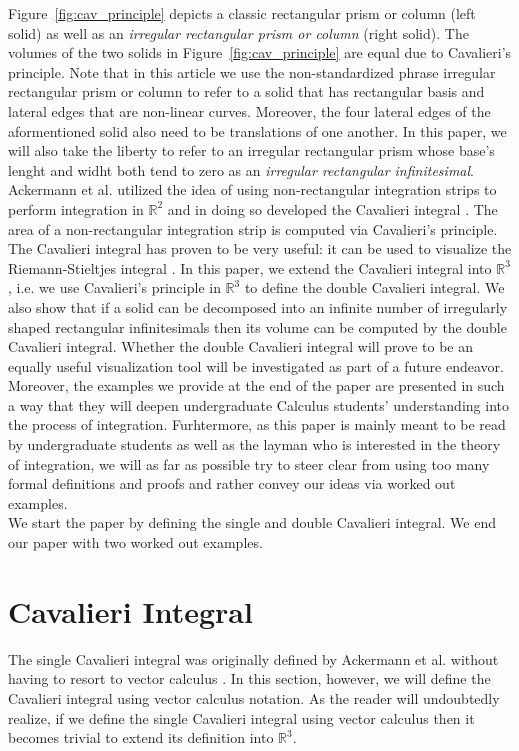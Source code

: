 \documentclass{article}
\theoremstyle{theorem}
\theoremstyle{definition}
\begin{document}
\noindent
Figure~\ref{fig:cav_principle} depicts a classic rectangular prism or column (left solid) as well as an \emph{irregular rectangular prism or column} (right solid). The volumes of the two solids in Figure~\ref{fig:cav_principle} are equal due 
to Cavalieri's principle. Note that in this article we use the non-standardized phrase irregular rectangular prism or column to refer to a solid that has rectangular 
basis and lateral edges that are non-linear curves. Moreover, the four lateral edges of the aformentioned solid also need to be translations of one another. In this paper, we will also take the liberty to refer to an irregular rectangular prism whose base's
lenght and widht both tend to zero as an \emph{irregular rectangular infinitesimal}. \\

\noindent
Ackermann et al. utilized the idea of using non-rectangular integration strips to perform integration in $\mathbb{R}^2$ and in doing so developed the Cavalieri integral \cite{ackermann12}. 
The area of a non-rectangular integration strip is computed via Cavalieri’s principle. The Cavalieri integral has proven to be very useful: it can be used to visualize the Riemann-Stieltjes integral \cite{grobler19}. In this paper, we extend the Cavalieri integral into $\mathbb{R}^3$, i.e. we use Cavalieri's principle in $\mathbb{R}^3$ to define the double 
Cavalieri integral. We also show that if a solid can be decomposed into an infinite number of irregularly shaped rectangular infinitesimals then its volume can be computed 
by the double Cavalieri integral. Whether the double Cavalieri integral will prove to be an equally useful visualization tool will be investigated as part of a future endeavor.
Moreover, the examples we provide at the end of the paper are presented in such a way that they will deepen undergraduate Calculus students' understanding into the 
process of integration. Furhtermore, as this paper is mainly meant to be read by undergraduate students as well as the layman who is interested in the theory of integration, we will as far as possible try to steer clear from using too many formal definitions and proofs and rather convey our ideas via worked out examples.\\ 

\noindent
We start the paper by defining the single and double Cavalieri integral. We end our paper with two worked out examples.

\section{Cavalieri Integral}
The single Cavalieri integral was originally defined by Ackermann et al. without having to resort to vector calculus \cite{ackermann12,stewart1999}. In this section, however, we will define the Cavalieri integral using vector calculus notation. As the reader will undoubtedly realize, if we define the single Cavalieri integral using vector calculus then it becomes trivial to
extend its definition into $\mathbb{R}^3$.\\
\end{document}
